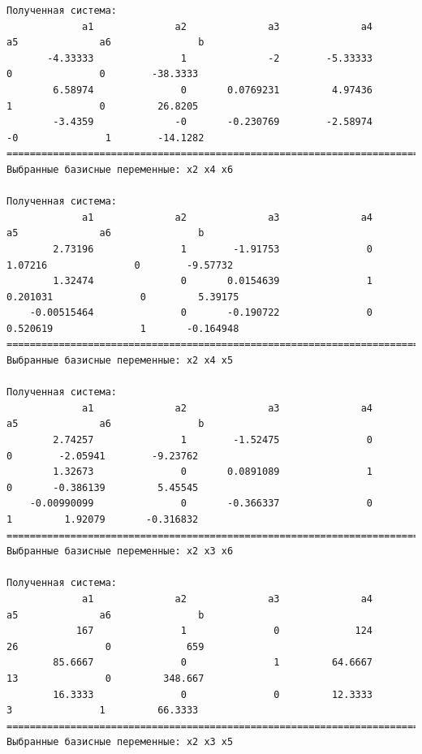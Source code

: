 \documentclass[a4paper,14pt]{extarticle}
\begin{document}
\begin{verbatim}
Полученная система:
             a1              a2              a3              a4              a5              a6               b
       -4.33333               1              -2        -5.33333               0               0        -38.3333
        6.58974               0       0.0769231         4.97436               1               0         26.8205
        -3.4359              -0       -0.230769        -2.58974              -0               1        -14.1282
==================================================================================================================
Выбранные базисные переменные: x2 x4 x6

Полученная система:
             a1              a2              a3              a4              a5              a6               b
        2.73196               1        -1.91753               0         1.07216               0        -9.57732
        1.32474               0       0.0154639               1        0.201031               0         5.39175
    -0.00515464               0       -0.190722               0        0.520619               1       -0.164948
==================================================================================================================
Выбранные базисные переменные: x2 x4 x5

Полученная система:
             a1              a2              a3              a4              a5              a6               b
        2.74257               1        -1.52475               0               0        -2.05941        -9.23762
        1.32673               0       0.0891089               1               0       -0.386139         5.45545
    -0.00990099               0       -0.366337               0               1         1.92079       -0.316832
==================================================================================================================
Выбранные базисные переменные: x2 x3 x6

Полученная система:
             a1              a2              a3              a4              a5              a6               b
            167               1               0             124              26               0             659
        85.6667               0               1         64.6667              13               0         348.667
        16.3333               0               0         12.3333               3               1         66.3333
==================================================================================================================
Выбранные базисные переменные: x2 x3 x5


\end{verbatim}
\end{document}
